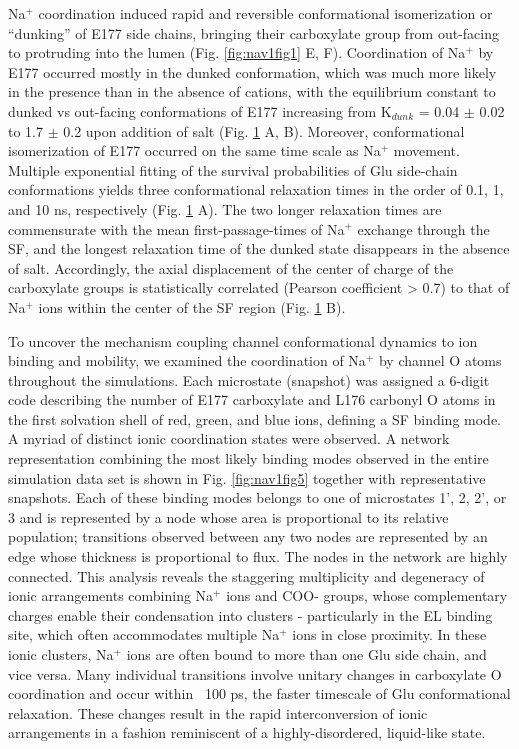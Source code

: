 \begin{refsection}
\begin{figure}[!htb]
\label{fig:nav1figS8}
\end{figure}

Na$^+$ coordination induced rapid and reversible conformational isomerization or ``dunking'' of E177 side chains, bringing their carboxylate group from out-facing to protruding into the lumen (Fig. \ref{fig:nav1fig1} E, F).  Coordination of Na$^+$ by E177 occurred mostly in the dunked conformation, which was much more likely in the presence than in the absence of cations, with the equilibrium constant to dunked vs out-facing conformations of E177 increasing from K$_{dunk}$ = 0.04 $\pm$ 0.02 to 1.7 $\pm$ 0.2 upon addition of salt (Fig. \ref{fig:nav1figS8} A, B).  Moreover, conformational isomerization of E177 occurred on the same time scale as Na$^+$ movement.  Multiple exponential fitting of the survival probabilities of Glu side-chain conformations yields three conformational relaxation times in the order of 0.1, 1, and 10 ns, respectively (Fig. \ref{fig:nav1figS8} A).  The two longer relaxation times are commensurate with the mean first-passage-times of Na$^+$ exchange through the SF, and the longest relaxation time of the dunked state disappears in the absence of salt.  Accordingly, the axial displacement of the center of charge of the carboxylate groups is statistically correlated (Pearson coefficient > 0.7) to that of Na$^+$ ions within the center of the SF region (Fig. \ref{fig:nav1figS8} B).

To uncover the mechanism coupling channel conformational dynamics to ion binding and mobility, we examined the coordination of Na$^+$ by channel O atoms throughout the simulations.  Each microstate (snapshot) was assigned a 6-digit code describing the number of E177 carboxylate and L176 carbonyl O atoms in the first solvation shell of red, green, and blue ions, defining a SF binding mode.  A myriad of distinct ionic coordination states were observed.  A network representation combining the most likely binding modes observed in the entire simulation data set is shown in Fig. \ref{fig:nav1fig5} together with representative snapshots.  Each of these binding modes belongs to one of microstates 1', 2, 2', or 3 and is represented by a node whose area is proportional to its relative population; transitions observed between any two nodes are represented by an edge whose thickness is proportional to flux.  The nodes in the network are highly connected.  This analysis reveals the staggering multiplicity and degeneracy of ionic arrangements combining Na$^+$ ions and COO- groups, whose complementary charges enable their condensation into clusters - particularly in the EL binding site, which often accommodates multiple Na$^+$ ions in close proximity.  In these ionic clusters, Na$^+$ ions are often bound to more than one Glu side chain, and vice versa.  Many individual transitions involve unitary changes in carboxylate O coordination and occur within ~100 ps, the faster timescale of Glu conformational relaxation.  These changes result in the rapid interconversion of ionic arrangements in a fashion reminiscent of a highly-disordered, liquid-like state. 


\end{refsection}
